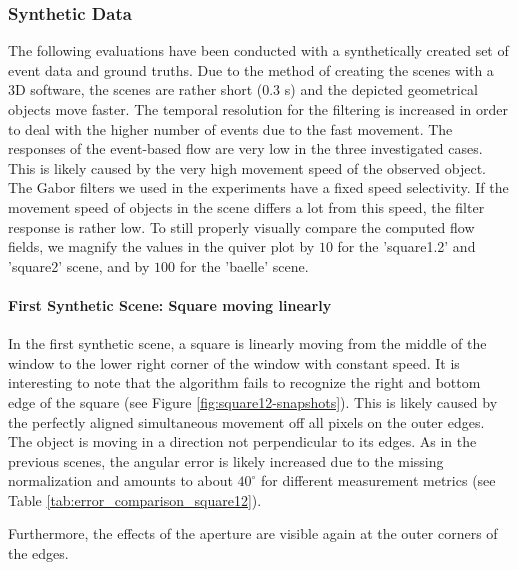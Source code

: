 \subsubsection{Synthetic Data}

The following evaluations have been conducted with a synthetically created set of event data and ground truths.
Due to the method of creating the scenes with a 3D software, the scenes are rather short ($0.3$ s) and the depicted geometrical objects move faster.
The temporal resolution for the filtering is increased in order to deal with the higher number of events due to the fast movement.
The responses of the event-based flow are very low in the three investigated cases. 
This is likely caused by the very high movement speed of the observed object.
The Gabor filters we used in the experiments have a fixed speed selectivity. 
If the movement speed of objects in the scene differs a lot from this speed, the filter response is rather low.
To still properly visually compare the computed flow fields, we magnify the values in the quiver plot by $10$ for the 'square1.2' and 'square2' scene, and by $100$ for the 'baelle' scene.

\paragraph{First Synthetic Scene: Square moving linearly}


In the first synthetic scene, a square is linearly moving from the middle of the window to the lower right corner of the window with constant speed.
It is interesting to note that the algorithm fails to recognize the right and bottom edge of the square (see Figure \ref{fig:square12-snapshots}).
This is likely caused by the perfectly aligned simultaneous movement off all pixels on the outer edges.
The object is moving in a direction not perpendicular to its edges.
As in the previous scenes, the angular error is likely increased due to the missing normalization and amounts to about $40^\circ$ for different measurement metrics (see Table \ref{tab:error_comparison_square12}). 
 
Furthermore, the effects of the aperture are visible again at the outer corners of the edges.

